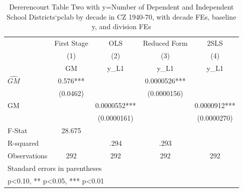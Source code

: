\begin{table}[htbp]\centering
\def\sym#1{\ifmmode^{#1}\else\(^{#1}\)\fi}
\caption{Dererencourt Table Two with y=Number of Dependent and Independent School Districts`pclab by decade in CZ 1940-70, with decade FEs, baseline y, and division FEs}
\begin{tabular}{l*{4}{c}}
\toprule
                    & First Stage   &         OLS   &Reduced Form   &        2SLS   \\
                    &\multicolumn{1}{c}{(1)}&\multicolumn{1}{c}{(2)}&\multicolumn{1}{c}{(3)}&\multicolumn{1}{c}{(4)}\\
                    &\multicolumn{1}{c}{GM}&\multicolumn{1}{c}{y\_L1}&\multicolumn{1}{c}{y\_L1}&\multicolumn{1}{c}{y\_L1}\\
\midrule
$\hat{GM}$          &       0.576***&               &   0.0000526***&               \\
                    &    (0.0462)   &               & (0.0000156)   &               \\
\addlinespace
GM                  &               &   0.0000552***&               &   0.0000912***\\
                    &               & (0.0000161)   &               & (0.0000270)   \\
\midrule
F-Stat              &      28.675   &               &               &               \\
R-squared           &               &        .294   &        .293   &               \\
Observations        &         292   &         292   &         292   &         292   \\
\bottomrule
\multicolumn{5}{l}{\footnotesize Standard errors in parentheses}\\
\multicolumn{5}{l}{\footnotesize * p<0.10, ** p<0.05, *** p<0.01}\\
\end{tabular}
\end{table}
